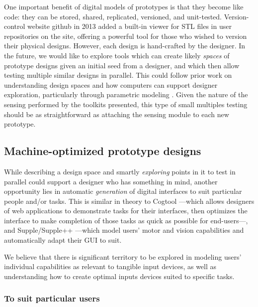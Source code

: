 One important benefit of digital models of prototypes is that they become like code: they can be stored, shared, replicated, versioned, and unit-tested. Version-control website github \cite{github} in 2013 added a built-in viewer for STL files in user repositories on the site, offering a powerful tool for those who wished to version their physical designs. However, each design is hand-crafted by the designer. In the future, we would like to explore tools which can create likely \emph{spaces} of prototype designs given an initial seed from a designer, and which then allow testing multiple similar designs in parallel. This could follow prior work on understanding design spaces and how computers can support designer exploration, particularly through parametric modeling \cite{woodbury-designspace, woodbury-parametric}. Given the nature of the sensing performed by the toolkits presented, this type of small multiples testing should be as straightforward as attaching the sensing module to each new prototype.

\subsection{Machine-optimized prototype designs}

While describing a design space and smartly \emph{exploring} points in it to test in parallel could support a designer who has something in mind, another opportunity lies in automatic \emph{generation} of digital interfaces to suit particular people and/or tasks. This is similar in theory to Cogtool \cite{john-cogtool}---which allows designers of web applications to demonstrate tasks for their interfaces, then optimizes the interface to make completion of those tasks as quick as possible for end-users---, and Supple/Supple++ \cite{gajos-supple,gajos-supplepp}---which model users' motor and vision capabilities and automatically adapt their GUI to suit.

We believe that there is significant territory to be explored in modeling users' individual capabilities as relevant to tangible input devices, as well as understanding how to create optimal inputs devices suited to specific tasks.

    \subsubsection{To suit particular users}

